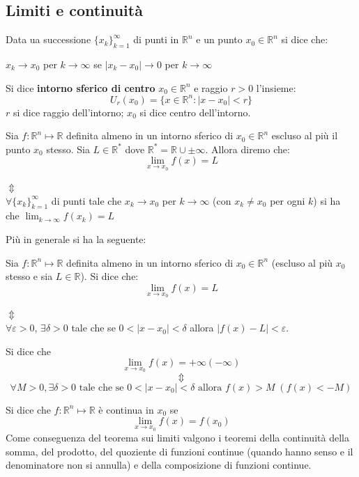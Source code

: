 \documentclass[a4paper]{article}
\numberwithin{equation}{subsection}
\begin{document}
\subsection{Limiti e continuità}

\dfn{}
{
    Data ua successione $\{x_k\}_{k=1}^{\infty}$ di punti in $\mathbb{R}^n$ e un punto $x_0 \in \mathbb{R}^n$ si dice che:
    \begin{center}
        $x_k \rightarrow x_0$ per $k \rightarrow \infty$ se $|x_k - x_0| \rightarrow 0$ per $k \rightarrow \infty$ 
    \end{center}
    Si dice \textbf{intorno sferico di centro} $x_0 \in \mathbb{R}^n$ e raggio $r > 0$ l'insieme:
    \[U_r(x_0) = \{x \in \mathbb{R}^n : |x - x_0| < r\}\]
    $r$ si dice raggio dell'intorno; $x_0$ si dice centro dell'intorno.
}
{
    Sia $f : \mathbb{R}^n \mapsto \mathbb{R}$ definita almeno in un intorno sferico di $x_0 \in \mathbb{R}^n$
    escluso al più il punto $x_0$ stesso. Sia $L \in \mathbb{R}^*$ dove $\mathbb{R}^* = \mathbb{R} \cup {\pm \infty}$. Allora diremo che:
    \[\lim_{x \rightarrow x_0} f(x) = L\]
    \begin{center}
        $\Updownarrow$\\
        $\forall \{{x_k}\}_{k=1}^{\infty}$ di punti tale che $x_k \rightarrow x_0$ per $k \rightarrow \infty$ (con $x_k \neq x_0$ per ogni $k$) si ha che $\lim_{k \rightarrow \infty}f(x_k) = L$ 
    \end{center}
}
Più in generale si ha la seguente:
{
    Sia $f : \mathbb{R}^n \mapsto \mathbb{R}$ definita almeno in un intorno sferico di $x_0 \in \mathbb{R}^n$ (escluso al più $x_0$ stesso e sia $L \in \mathbb{R}$). Si dice che:
    \[\lim_{x \rightarrow x_0} f(x) = L\]
    \begin{center}
        $\Updownarrow$\\
        $\forall \varepsilon > 0$, $\exists \delta > 0$ tale che se $0 < |x - x_0| < \delta$ allora $|f(x) - L| < \varepsilon$. 
    \end{center}
    Si dice che
    \[\lim_{x \rightarrow x_0} f(x) = +\infty (- \infty)\]
    \[\Updownarrow\]
    \[\forall M > 0, \exists \delta > 0 \text{ tale che se } 0 < |x - x_0| < \delta \text{ allora } f(x) > M \; (f(x) < -M)\]
}
{
    Si dice che $f : \mathbb{R}^n \mapsto \mathbb{R}$ è continua in $x_0$ se 
    \[\lim_{x \rightarrow x_0} f(x) = f(x_0)\]
}
\noindent
Come conseguenza del teorema sui limiti valgono i teoremi della continuità della somma, del prodotto, del quoziente di funzioni continue (quando hanno senso e il denominatore non si annulla)
e della composizione di funzioni continue.
\end{document}
